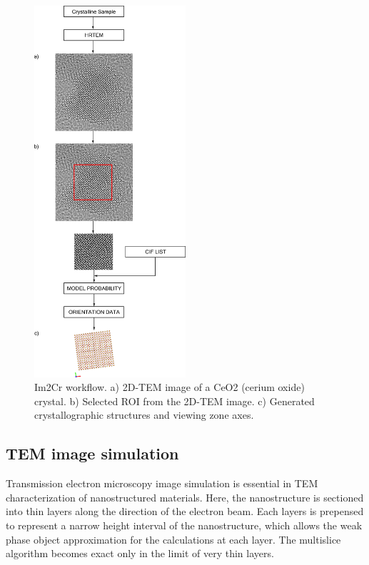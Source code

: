 \documentclass[
  oneside,
  11pt, a4paper,
  footinclude=true,
  headinclude=true,
  cleardoublepage=empty
]{scrbook}
\begin{document}
\begin{figure}[!ht]
	\begin{center}
	
	\includegraphics[width=0.5\textwidth]{img/Im2Cr_workflow.png}
			\caption[Im2Cr workflow]{Im2Cr workflow.\newline 
			a) 2D-TEM image of a CeO2 (cerium oxide) crystal.\newline
			b) Selected ROI from the 2D-TEM image.\newline
			c) Generated crystallographic structures and viewing zone axes.}
	\label{fig:im2cr_worflow}
		\end{center}
	\end{figure}
	
	\clearpage

	
		\subsection{TEM image simulation}
		
		Transmission electron microscopy image simulation is essential in TEM characterization of nanostructured materials.
		Here, the nanostructure is sectioned into thin layers along the direction of the electron beam. Each layers is prepensed to represent a narrow height interval of the nanostructure, which allows the weak phase object approximation for the calculations at each layer. The multislice algorithm becomes exact only in the limit of very thin layers.\par 
		
\end{document}
